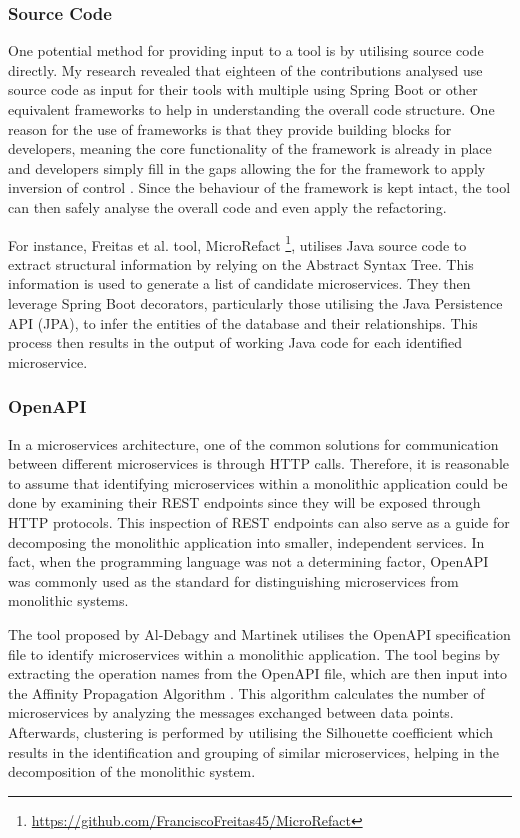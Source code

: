 \documentclass[conference]{IEEEtran}
\begin{document}
\subsubsection*{Source Code}

One potential method for providing input to a tool is by utilising source code
directly. My research revealed that eighteen of the contributions analysed use
source code as input for their tools with multiple using Spring Boot or other
equivalent frameworks to help in understanding the overall code structure. One
reason for the use of frameworks is that they provide building blocks for
developers, meaning the core functionality of the framework is already in place
and developers simply fill in the gaps allowing the for the framework to apply
inversion of control \cite{gamma1995design}. Since the behaviour of the
framework is kept intact, the tool can then safely analyse the overall code and
even apply the refactoring.

For instance, Freitas et al.  tool, MicroRefact
\footnote{\url{https://github.com/FranciscoFreitas45/MicroRefact}}, utilises
Java source code to extract structural information by relying on the Abstract
Syntax Tree. This information is used to generate a list of candidate
microservices. They then leverage Spring Boot decorators, particularly those
utilising the Java Persistence API (JPA), to infer the entities of the database
and their relationships. This process then results in the output of working
Java code for each identified microservice.

\subsubsection*{OpenAPI}

In a microservices architecture, one of the common solutions for communication
between different microservices is through HTTP calls. Therefore, it is
reasonable to assume that identifying microservices within a monolithic
application could be done by examining their REST endpoints since they will be
exposed through HTTP protocols. This inspection of REST endpoints can also
serve as a guide for decomposing the monolithic application into smaller,
independent services. In fact, when the programming language was not a
determining factor, OpenAPI was commonly used as the standard for
distinguishing microservices from monolithic systems.

The tool proposed by Al-Debagy and Martinek  utilises the
OpenAPI specification file to identify microservices within a monolithic
application. The tool begins by extracting the operation names from the OpenAPI
file, which are then input into the Affinity Propagation Algorithm
\cite{frey2007clustering}. This algorithm calculates the number of
microservices by analyzing the messages exchanged between data points.
Afterwards, clustering is performed by utilising the Silhouette coefficient
\cite{rousseeuw1987silhouettes} which results in the identification and
grouping of similar microservices, helping in the decomposition of the
monolithic system.
\end{document}
